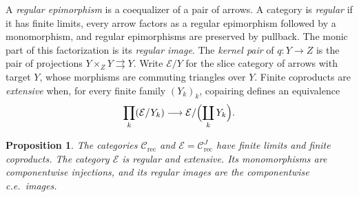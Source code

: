 \documentclass[11pt]{article}
\newtheorem{proposition}[theorem]{Proposition}
\begin{document}
A \emph{regular epimorphism} is a coequalizer of a pair of arrows.
A category is \emph{regular} if it has finite limits, every arrow
factors as a regular epimorphism followed by a monomorphism, and
regular epimorphisms are preserved by pullback. The monic part of
this factorization is its \emph{regular image}. The \emph{kernel
pair} of $q:Y\to Z$ is the pair of projections
$Y\times_ZY\rightrightarrows Y$.
Write $\mathcal E/Y$ for the slice category of arrows with target $Y$,
whose morphisms are commuting triangles over $Y$.
Finite coproducts are \emph{extensive} when, for every finite family
$(Y_k)_k$, copairing defines an equivalence
\[
 \prod_k(\mathcal E/Y_k)\longrightarrow
 \mathcal E/\Bigl(\coprod_kY_k\Bigr).
\]

\begin{proposition}\label{prop:fork-total}
The categories $\mathcal C_{\mathrm{rec}}$ and
$\mathcal E=\mathcal C_{\mathrm{rec}}^J$ have finite limits and
finite coproducts. The category $\mathcal E$ is regular and
extensive. Its monomorphisms are componentwise injections, and its
regular images are the componentwise c.e.\ images.
\end{proposition}
\end{document}
